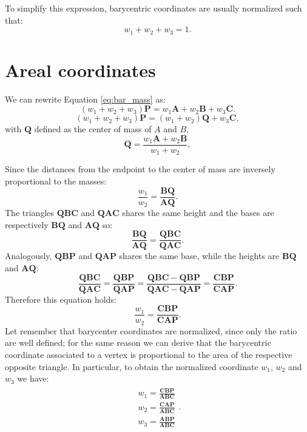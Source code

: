 To simplify this expression, barycentric coordinates are usually normalized such that:
\begin{equation}
  w_1 + w_2 + w_3 = 1.
\end{equation}

\section{Areal coordinates}
We can rewrite Equation \eqref{eq:bar_mass} as:
\begin{equation}
\label{eq:bar_mass2}
 (w_1 + w_2 + w_3) \mathbf{P} =  w_1 \mathbf{A} + w_2 \mathbf{B} + w_3 \mathbf{C}.
\end{equation}
\begin{equation}
\label{eq:bar_mass2}
 (w_1 + w_2 + w_3) \mathbf{P} =  (w_1  + w_2) \mathbf{Q} + w_3 \mathbf{C},
\end{equation}
with $\mathbf{Q}$ defined as the center of mass of $A$ and $B$,
\begin{equation}
 \mathbf{Q} = \frac{w_1 \mathbf{A} + w_2 \mathbf{B}}{w_1 + w_2},
\end{equation}

Since the  distances from the endpoint to the center of mass are inversely proportional to the masses:
\begin{equation}
 \frac{w_1}{w_2} = \frac{\mathbf{BQ}}{\mathbf{AQ}}.
\end{equation}
The triangles $\mathbf{QBC}$ and $\mathbf{QAC}$ shares the same height and the bases are respectively $\mathbf{BQ}$ and $\mathbf{AQ}$ so:
\begin{equation}
 \frac{\mathbf{BQ}}{\mathbf{AQ}}  = \frac{\mathbf{QBC}}{\mathbf{QAC}}.
\end{equation}
Analogously, $\mathbf{QBP}$ and $\mathbf{QAP}$ shares the same base, while the heights are $\mathbf{BQ}$ and $\mathbf{AQ}$:
\begin{equation}
  \frac{\mathbf{QBC}}{\mathbf{QAC}} =  \frac{\mathbf{QBP}}{\mathbf{QAP}} = 
  \frac{\mathbf{QBC-QBP}}{\mathbf{QAC-QAP}} = \frac{\mathbf{CBP}}{\mathbf{CAP}}.
\end{equation}
Therefore this equation holds:
\begin{equation}
  \frac{w_1}{w_2} =  \frac{\mathbf{CBP}}{\mathbf{CAP}}.
\end{equation}
Let remember that barycenter coordinates are normalized, since only the ratio are well defined; for the same reason we can derive that the barycentric coordinate associated to a vertex is proportional to the area of the respective opposite triangle.
In particular, to obtain the normalized coordinate $w_1$, $w_2$ and $w_3$ we have:
\begin{align}
\label{eqn:eqlabel}
\begin{split}
 w_1 =  \frac{\mathbf{CBP}}{\mathbf{ABC}} \\
 w_2 =  \frac{\mathbf{CAP}}{\mathbf{ABC}} \\
 w_3 =  \frac{\mathbf{ABP}}{\mathbf{ABC}} 
\end{split}.
\end{align}


